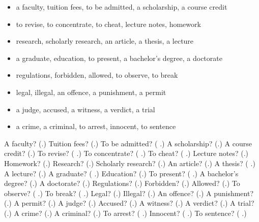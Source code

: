 \begin{itemize}
\raggedright
  \item a faculty, tuition fees, to be admitted, a scholarship, a course credit
  \item to revise, to concentrate, to cheat, lecture notes, homework
  \item research, scholarly research, an article, a thesis, a lecture
  \item a graduate, education, to present, a bachelor's degree, a doctorate
  \item regulations, forbidden, allowed, to observe, to break
  \item legal, illegal, an offence, a punishment, a permit
  \item a judge, accused, a witness, a verdict, a trial
  \item a crime, a criminal, to arrest, innocent, to sentence
\end{itemize}

\begin{tcolorbox}[breakable,colback=teal!4,colframe=teal!35!black,title={Before you move on}]
A faculty? (\textbf{}.) Tuition fees? (\textbf{}.) To be admitted? (\textbf{ }.) A scholarship? (\textbf{}.) A course credit? (\textbf{}.) To revise? (\textbf{ }.) To concentrate? (\textbf{ }.) To cheat? (\textbf{ }.) Lecture notes? (\textbf{}.) Homework? (\textbf{}.) Research? (\textbf{}.) Scholarly research? (\textbf{}.) An article? (\textbf{}.) A thesis? (\textbf{ }.) A lecture? (\textbf{}.) A graduate? (\textbf{ }.) Education? (\textbf{}.) To present? (\textbf{ }.) A bachelor's degree? (\textbf{}.) A doctorate? (\textbf{}.) Regulations? (\textbf{}.) Forbidden? (\textbf{}.) Allowed? (\textbf{}.) To observe? (\textbf{ }.) To break? (\textbf{ }.) Legal? (\textbf{}.) Illegal? (\textbf{}.) An offence? (\textbf{}.) A punishment? (\textbf{}.) A permit? (\textbf{}.) A judge? (\textbf{}.) Accused? (\textbf{}.) A witness? (\textbf{}.) A verdict? (\textbf{}.) A trial? (\textbf{}.) A crime? (\textbf{}.) A criminal? (\textbf{}.) To arrest? (\textbf{ }.) Innocent? (\textbf{ }.) To sentence? (\textbf{ }.)
\end{tcolorbox}

